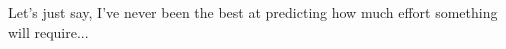 \begin{acknowledgements}
    Let's just say, I've never been the best at predicting how much effort something will require...
\end{acknowledgements}
